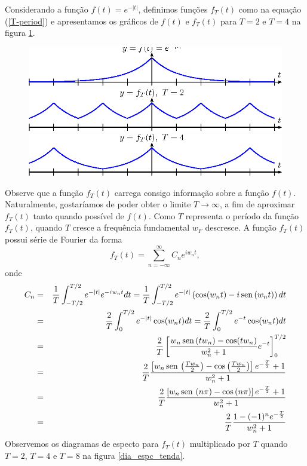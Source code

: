 \begin{ex}{\label{ex_Transf_1}} Considerando a função $f(t)=e^{-|t|}$, definimos funções $f_T(t)$ como na equação (\ref{T-period}) e apresentamos os gráficos de $f(t)$ e $f_T(t)$ para $T=2$ e $T=4$ na figura \ref{fig_T_tenda}.
\begin{figure}[!ht]
\begin{center}

\includegraphics{cap_transformada_de_fourier/pics/figura_1}
\includegraphics{cap_transformada_de_fourier/pics/figura_2}
\includegraphics{cap_transformada_de_fourier/pics/figura_3}\end{center}
\caption{\label{fig_T_tenda}}
\end{figure}
Observe que a função $f_T(t)$ carrega consigo informação sobre a função $f(t)$. Naturalmente, gostaríamos de poder obter o limite $T\to \infty$, a fim de aproximar $f_T(t)$ tanto quando possível de $f(t)$. Como $T$ representa o período da função $f_T(t)$, quando $T$ cresce a frequência fundamental $w_F$ descresce. A função $f_T(t)$ possui série de Fourier da forma
$$
f_T(t)=\sum_{n=-\infty}^\infty C_n e^{iw_n t},
$$
onde
\begin{eqnarray}
 \nonumber C_n&=&\frac{1}{T}\int_{-T/2}^{T/2}e^{-|t|}e^{-iw_nt}dt = \frac{1}{T}\int_{-T/2}^{T/2}e^{-|t|}\left(\cos(w_nt)-i\operatorname{sen}\,(w_nt)\right)dt\\
 \nonumber &=&\frac{2}{T}\int_{0}^{T/2}e^{-|t|}\cos(w_nt)dt= \frac{2}{T}\int_{0}^{T/2}e^{-t}\cos(w_nt)dt\\
 \nonumber &=&\frac{2}{T}\left[\frac{ w_n \operatorname{sen}\,(t w_n)-\cos(t w_n)}{w_n^2+1}e^{-t}\right]_0^{T/2}\\
 \nonumber &=&\frac{2}{T}\frac{ \left[w_n \operatorname{sen}\,\left(\frac{Tw_n}{2}\right)-\cos\left(\frac{Tw_n}{2}\right)\right]e^{-\frac{T}{2}}+1}{w_n^2+1}\\
 \nonumber &=&\frac{2}{T}\frac{ \left[w_n \operatorname{sen}\,\left(n\pi\right)-\cos\left(n\pi\right)\right]e^{-\frac{T}{2}}+1}{w_n^2+1}\\
&=&\frac{2}{T}\frac{ 1-(-1)^ne^{-\frac{T}{2}}}{w_n^2+1}      {\label{TCn}}
 \end{eqnarray}
Observemos os diagramas de especto para $f_T(t)$ multiplicado por $T$ quando $T=2$, $T=4$ e $T=8$ na figura \ref{dia_espc_tenda}.
 \begin{figure}[!ht]


\end{figure}
\end{ex}
